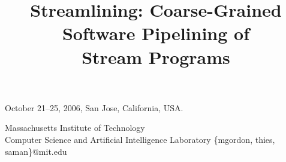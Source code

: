 \documentclass[preprint]{sigplanconf}
\begin{document}
 {October 21--25, 2006, San Jose, California, USA.} 


\title{Streamlining: Coarse-Grained Software Pipelining of \\Stream Programs}

           {Massachusetts Institute of Technology\\
	    Computer Science and Artificial Intelligence Laboratory}
           {\{mgordon, thies, saman\}@mit.edu}

\maketitle

\begin{abstract}

\end{abstract}















{\small
{

}
}

\end{document}
